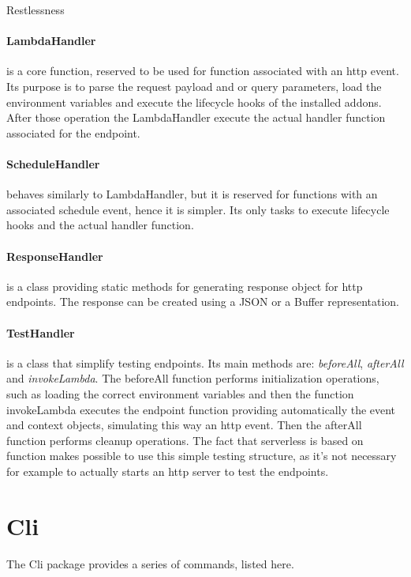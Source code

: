 \begin{chapter}{Restlessness}
    \paragraph{LambdaHandler} is a core function, reserved to be used for function
    associated with an http event. Its purpose is to parse the request payload and
    or query parameters, load the environment variables and execute the lifecycle
    hooks of the installed addons. After those operation the LambdaHandler execute
    the actual handler function associated for the endpoint.

    \paragraph{ScheduleHandler} behaves similarly to LambdaHandler, but it is
    reserved for functions with an associated schedule event, hence it is simpler.
    Its only tasks to execute lifecycle hooks and the actual handler function.

    \paragraph{ResponseHandler} is a class providing static methods for generating
    response object for http endpoints. The response can be created using a JSON
    or a Buffer representation.

    \paragraph{TestHandler} is a class that simplify testing endpoints. Its main
    methods are: \textit{beforeAll}, \textit{afterAll} and \textit{invokeLambda}.
    The beforeAll function performs initialization operations, such as loading the
    correct environment variables and then the function invokeLambda executes the
    endpoint function providing automatically the event and context objects,
    simulating this way an http event. Then the afterAll function performs cleanup
    operations.
    The fact that serverless is based on function makes possible to use this simple
    testing structure, as it's not necessary for example to actually starts an http
    server to test the endpoints.

    \section{Cli}
    The Cli package provides a series of commands, listed here.


\end{chapter}
